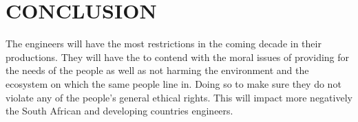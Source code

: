 \documentclass[12pt]{witseiepaper}
\begin{document}



\section{CONCLUSION}

The engineers will have the most restrictions in the coming decade in their productions. They will have the to contend with the moral issues of providing for the needs of the people as well as not harming the environment and the ecosystem on which the same people line in. Doing so to make sure they do not violate any of the people’s general ethical rights. This will impact more negatively the South African and developing countries engineers.


\nocite{*}


\end{document}
